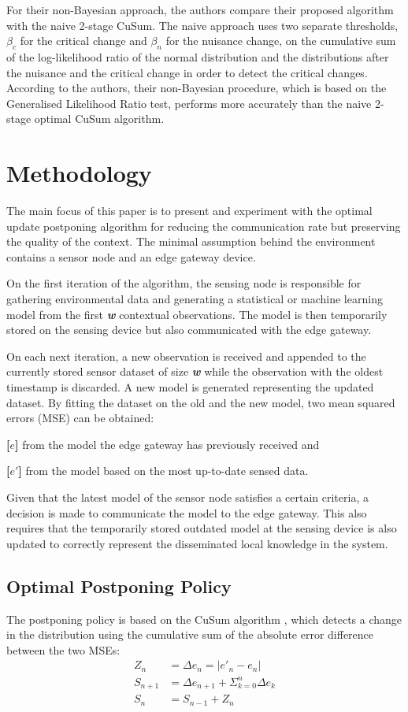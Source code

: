 \documentclass{mpaper}
\begin{document}
For their non-Bayesian approach, the authors compare their proposed algorithm with the naive 2-stage CuSum. The naive approach uses two separate thresholds, $\beta_c$ for the critical change and $\beta_n$ for the nuisance change, on the cumulative sum of the log-likelihood ratio of the normal distribution and the distributions after the nuisance and the critical change in order to detect the critical changes.
According to the authors, their non-Bayesian procedure, which is based on the Generalised Likelihood Ratio test, performs more accurately than the naive 2-stage optimal CuSum algorithm.

\section{Methodology}

The main focus of this paper is to present and experiment with the optimal update postponing algorithm for reducing the communication rate but preserving the quality of the context. 
The minimal assumption behind the environment contains a sensor node and an edge gateway device. 

On the first iteration of the algorithm, the sensing node is responsible for gathering environmental data and generating a statistical or machine learning model from the first \textbf{\emph{w}} contextual observations. The model is then temporarily stored on the sensing device but also communicated with the edge gateway.

On each next iteration, a new observation is received and appended to the currently stored sensor dataset of size \textbf{\emph{w}} while the observation with the oldest timestamp is discarded. A new model is generated representing the updated dataset. By fitting the dataset on the old and the new model, two mean squared errors (MSE) can be obtained:

\textbf{[$e$]} from the model the edge gateway has previously received and

\textbf{[$e'$]} from the model based on the most up-to-date sensed data.

Given that the latest model of the sensor node satisfies a certain criteria, a decision is made to communicate the model to the edge gateway. This also requires that the temporarily stored outdated model at the sensing device is also updated to correctly represent the disseminated local knowledge in the system.

\subsection*{Optimal Postponing Policy}
The postponing policy is based on the CuSum algorithm \cite{page1954}, which detects a change in the distribution using the cumulative sum of the absolute error difference between the two MSEs:
\begin{align}
    Z_n &= \Delta e_n = | e'_n - e_n |\\
    S_{n+1} &= \Delta e_{n+1} + \Sigma_{k=0}^n \Delta e_k\\
    S_n &= S_{n-1} + Z_n\label{eq:1}
\end{align}
\end{document}
